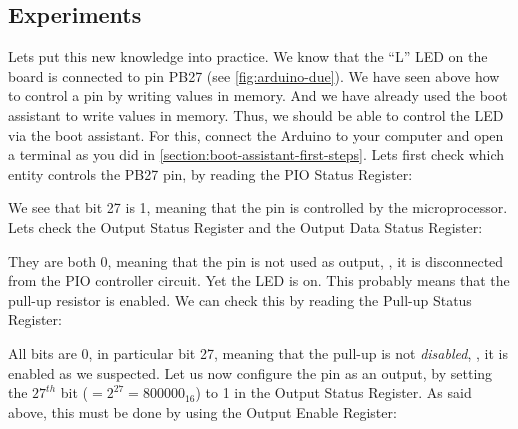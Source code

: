 \subsection{Experiments}\label{subsection:pio-experiments}

Lets put this new knowledge into practice. We know that the ``L'' LED on the
board is connected to pin PB27 (see \cref{fig:arduino-due}). We have seen above
how to control a pin by writing values in memory. And we have already used the
boot assistant to write values in memory. Thus, we should be able to control
the LED via the boot assistant. For this, connect the Arduino to your computer
and open a terminal as you did in \cref{section:boot-assistant-first-steps}.
Lets first check which entity controls the PB27 pin, by reading the PIO Status
Register:


We see that bit 27 is 1, meaning that the pin is controlled by the
microprocessor. Lets check the Output Status Register and the Output Data
Status Register:


They are both 0, meaning that the pin is not used as output, \ie, it is
disconnected from the PIO controller circuit. Yet the LED is on. This probably
means that the pull-up resistor is enabled. We can check this by reading the
Pull-up Status Register:


All bits are 0, in particular bit 27, meaning that the pull-up is not {\em
disabled}, \ie, it is enabled as we suspected. Let us now configure the pin as
an output, by setting the $27^{th}$ bit (\(=2^{27}=800000_{16}\)) to 1 in the
Output Status Register. As said above, this must be done by using the Output
Enable Register:


